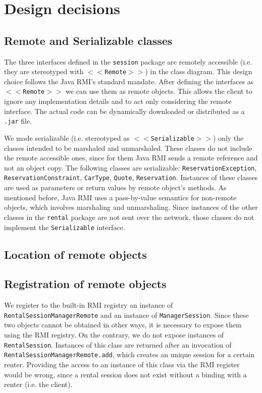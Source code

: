 \section{Design decisions}
\subsection{Remote and Serializable classes}
The three interfaces defined in the \texttt{session} package are remotely accessible (i.e. they are stereotyped with \texttt{$<<$Remote$>>$}) in the class diagram. This design choice follows the Java RMI's standard mandate. After defining the interfaces as \texttt{$<<$Remote$>>$} we can use them as remote objects. This allows the client to ignore any implementation details and to act only considering the remote interface. The actual code can be dynamically downloaded or distributed as a \texttt{.jar} file.

We made serializable (i.e. stereotyped as \texttt{$<<$Serializable$>>$}) only the classes intended to be marshaled and unmarshaled. These classes do not include the remote accessible ones, since for them Java RMI sends a remote reference and not an object copy. The following classes are serializable: \texttt{ReservationException}, \texttt{ReservationConstraint}, \texttt{CarType}, \texttt{Quote}, \texttt{Reservation}. Instances of these classes are used as parameters or return values by remote object's methods. As mentioned before, Java RMI uses a pass-by-value semantics for non-remote objects, which involves marshaling and unmarshaling. Since instances of the other classes in the \texttt{rental} package are not sent over the network, those classes do not implement the \texttt{Serializable} interface. 

\subsection{Location of remote objects} %

\subsection{Registration of remote objects}
We register to the built-in RMI registry an instance of \texttt{RentalSessionManagerRemote} and an instance of \texttt{ManagerSession}. Since these two objects cannot be obtained in other ways, it is necessary to expose them using the RMI registry. On the contrary, we do not expose instances of \texttt{RentalSession}. Instances of this class are returned after an invocation of \texttt{RentalSessionManagerRemote.add}, which creates an unique session for a certain renter. Providing the access to an instance of this class via the RMI register would be wrong, since a rental session does not exist without a binding with a renter (i.e. the client). 

